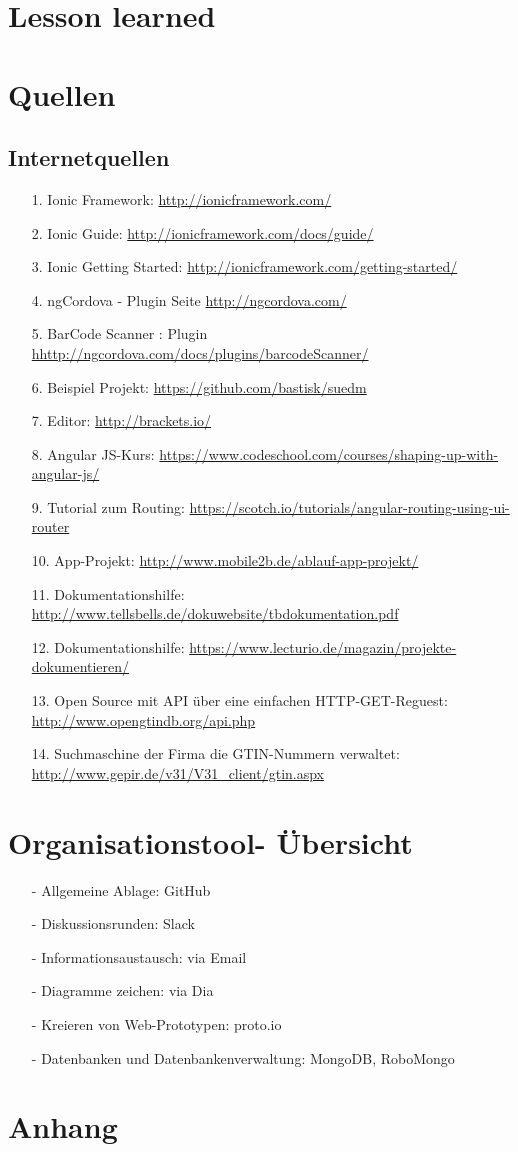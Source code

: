 \documentclass[12pt,a4paper]{article}
\begin{document}
\section{Lesson learned}
\newpage
\section*{Quellen}
\subsection*{Internetquellen}
\begin{itemize}
\item[1.]Ionic Framework: \url{http://ionicframework.com/}
\item[2.]Ionic Guide: \url{http://ionicframework.com/docs/guide/}
\item[3.]Ionic Getting Started: \url{http://ionicframework.com/getting-started/}
\item[4.]ngCordova - Plugin Seite \url{http://ngcordova.com/}
\item[5.]BarCode Scanner : Plugin \url{hhttp://ngcordova.com/docs/plugins/barcodeScanner/}
\item[6.]Beispiel Projekt: \url{https://github.com/bastisk/suedm}
\item[7.]Editor: \url{http://brackets.io/}
\item[8.]Angular JS-Kurs: \url{https://www.codeschool.com/courses/shaping-up-with-angular-js/}
\item[9.]Tutorial zum Routing: \url{https://scotch.io/tutorials/angular-routing-using-ui-router}
\item[10.]App-Projekt: \url{http://www.mobile2b.de/ablauf-app-projekt/}
\item[11.] Dokumentationshilfe: \url{http://www.tellsbells.de/dokuwebsite/tbdokumentation.pdf}
\item[12.] Dokumentationshilfe: \url{https://www.lecturio.de/magazin/projekte-dokumentieren/}
\item[13.] Open Source mit API über eine einfachen HTTP-GET-Reguest: \url{http://www.opengtindb.org/api.php}
\item[14.] Suchmaschine der Firma die GTIN-Nummern verwaltet: \url{http://www.gepir.de/v31/V31_client/gtin.aspx}
\end{itemize}

\newpage
\section*{Organisationstool- Übersicht}
\begin{itemize}
\item[-]Allgemeine Ablage: GitHub
\item[-]Diskussionsrunden: Slack
\item[-]Informationsaustausch: via Email
\item[-]Diagramme zeichen: via Dia 
\item[-]Kreieren von Web-Prototypen: proto.io
\item[-]Datenbanken und Datenbankenverwaltung: MongoDB, RoboMongo
\end{itemize}
\newpage
\section*{Anhang}
\end{document}
